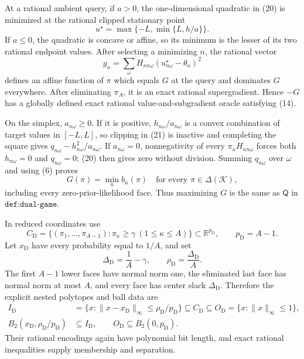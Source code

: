 At a rational ambient query, if \(a>0\), the one-dimensional quadratic in (20) is minimized at the rational clipped stationary point
\[
 u^\star=\max\{-L,\min\{L,h/a\}\}.
\tag{21}
\]
If \(a\le0\), the quadratic is concave or affine, so its minimum is the lesser of its two rational endpoint values.  After selecting a minimizing \(n\), the rational vector
\[
 g_\kappa=\sum_\omega H_{\kappa n\omega}
                 (u^\star_{n\omega}-\theta_\kappa)^2
\tag{22}
\]
defines an affine function of \(\pi\) which equals \(G\) at the query and dominates \(G\) everywhere.  After eliminating \(\pi_A\), it is an exact rational supergradient.  Hence \(-G\) has a globally defined exact rational value-and-subgradient oracle satisfying (14).

On the simplex, \(a_{n\omega}\ge0\).  If it is positive, \(h_{n\omega}/a_{n\omega}\) is a convex combination of target values in \([-L,L]\), so clipping in (21) is inactive and completing the square gives \(q_{n\omega}-h_{n\omega}^2/a_{n\omega}\).  If \(a_{n\omega}=0\), nonnegativity of every \(\pi_\kappa H_{\kappa n\omega}\) forces both \(h_{n\omega}=0\) and \(q_{n\omega}=0\); (20) then gives zero without division.  Summing \(q_{n\omega}\) over \(\omega\) and using (6) proves
\[
 G(\pi)=\min_n b_n(\pi)
 \quad\text{for every }\pi\in\Delta(\mathcal K),
\tag{23}
\]
including every zero-prior-likelihood face.  Thus maximizing \(G\) is the same as \(\mathsf Q\) in \(\texttt{def:dual-game}\).

In reduced coordinates use
\[
 C_{\mathrm D}=\{(\pi_1,\ldots,\pi_{A-1}):
                 \pi_\kappa\ge\gamma\ (1\le\kappa\le A)\}
       \subset\mathbb R^{p_{\mathrm D}},
 \qquad p_{\mathrm D}=A-1.
\tag{24}
\]
Let \(x_{\mathrm D}\) have every probability equal to \(1/A\), and set
\[
 \Delta_{\mathrm D}=\frac1A-\gamma,
 \qquad \rho_{\mathrm D}=\frac{\Delta_{\mathrm D}}A.
\tag{25}
\]
The first \(A-1\) lower faces have normal norm one, the eliminated last face has normal norm at most \(A\), and every face has center slack \(\Delta_{\mathrm D}\).  Therefore the explicit nested polytopes and ball data are
\[
 \begin{split}
 I_{\mathrm D}&=\{x:\|x-x_{\mathrm D}\|_\infty
                         \le\rho_{\mathrm D}/p_{\mathrm D}\}
       \subseteq C_{\mathrm D}
       \subseteq O_{\mathrm D}=\{x:\|x\|_\infty\le1\},\\
 B_2(x_{\mathrm D},\rho_{\mathrm D}/p_{\mathrm D})
       &\subseteq I_{\mathrm D},
 \qquad O_{\mathrm D}\subseteq B_2(0,p_{\mathrm D}).
 \end{split}
\tag{26}
\]
Their rational encodings again have polynomial bit length, and exact rational inequalities supply membership and separation.

